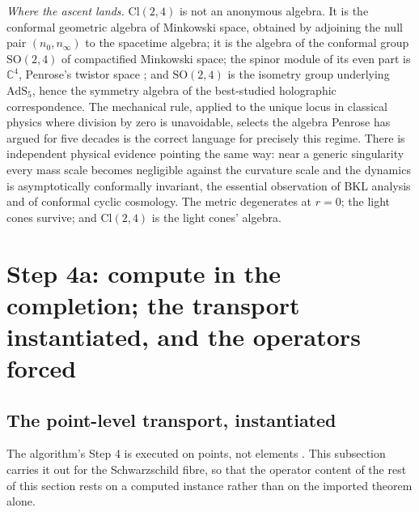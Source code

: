 \documentclass[11pt]{article}
\theoremstyle{definition}
\theoremstyle{plain}
\providecommand{\C}{}\renewcommand{\C}{\mathbb{C}}
\providecommand{\Cl}{}\renewcommand{\Cl}{\mathrm{Cl}}
\providecommand{\nInf}{}\renewcommand{\nInf}{n_\infty}
\providecommand{\nO}{}\renewcommand{\nO}{n_0}
\begin{document}
\label{c:note.singularity.setting-step-3-apply-rule-2}
\emph{Where the ascent lands.} $\Cl(2,4)$ is not an anonymous algebra. It is the conformal geometric algebra of Minkowski space, obtained by adjoining the null pair $(\nO, \nInf)$ to the spacetime algebra; it is the algebra of the conformal group $\mathrm{SO}(2,4)$ of compactified Minkowski space; the spinor module of its even part is $\C^4$, Penrose's twistor space \cite{Penrose1967}; and $\mathrm{SO}(2,4)$ is the isometry group underlying $\mathrm{AdS}_5$, hence the symmetry algebra of the best-studied holographic correspondence. The mechanical rule, applied to the unique locus in classical physics where division by zero is unavoidable, selects the algebra Penrose has argued for five decades is the correct language for precisely this regime. There is independent physical evidence pointing the same way: near a generic singularity every mass scale becomes negligible against the curvature scale and the dynamics is asymptotically conformally invariant, the essential observation of BKL analysis and of conformal cyclic cosmology. The metric degenerates at $r = 0$; the light cones survive; and $\Cl(2,4)$ is the light cones' algebra.

\section{Step 4a: compute in the completion; the transport instantiated, and the operators forced}

\subsection*{The point-level transport, instantiated}
\label{c:note.singularity.setting-point-level-transport-instantiated}
The algorithm's Step 4 is executed on points, not elements \cite[\S 8.1, Step 4]{ButlerT1}. This subsection carries it out for the Schwarzschild fibre, so that the operator content of the rest of this section rests on a computed instance rather than on the imported theorem alone.
\end{document}
